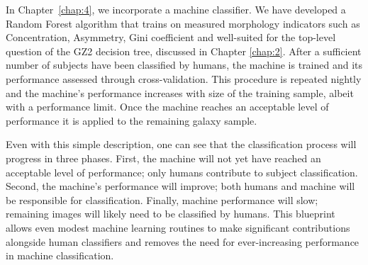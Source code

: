 In Chapter~\ref{chap:4}, we incorporate a machine classifier. We have developed a Random Forest algorithm that trains on measured morphology indicators such as Concentration, Asymmetry, Gini coefficient and  well-suited for the top-level question of the GZ2 decision tree, discussed in Chapter \ref{chap:2}. After a sufficient number of subjects have been classified by humans, the machine is trained and its performance assessed through cross-validation. This procedure is repeated nightly and the machine's performance increases with size of the training sample, albeit with a performance limit. Once the machine reaches an acceptable level of performance it is applied to the remaining galaxy sample. 

Even with this simple description, one can see that the classification process will progress in three phases.  First, the machine will not yet have reached an acceptable level of performance; only humans contribute to subject classification. Second, the machine's performance will improve; both humans and machine will be responsible for classification. Finally, machine performance will slow; remaining images will likely need to be classified by humans. This blueprint allows even modest machine learning routines to make significant contributions alongside human classifiers and removes the need for ever-increasing performance in machine classification.